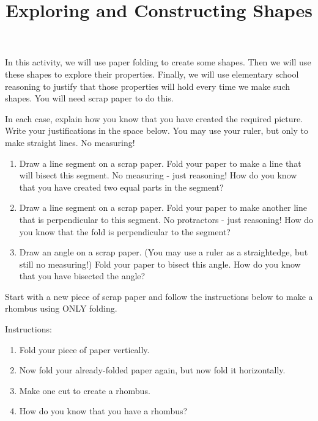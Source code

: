 \documentclass[noauthor, nooutcomes,handout]{ximera}
\title{Exploring and Constructing Shapes}
\begin{document}
\begin{abstract}

\end{abstract}
\maketitle
In this activity, we will use paper folding to create some shapes.  Then we will use these shapes to explore their properties. Finally, we will use elementary school reasoning to justify that those properties will hold every time we make such shapes. You will need scrap paper to do this. 

\begin{problem}

 
In each case, explain how you know that you have created the required picture.  Write your justifications in the space below. You may use your ruler, but only to make straight lines. No measuring!
\begin{enumerate}
    \item Draw a line segment on a scrap paper.  Fold your paper to make a line that will bisect this segment. No measuring - just reasoning! How do you know that you have created two equal parts in the segment?
    \item Draw a line segment on a scrap paper.  Fold your paper to make another line that is perpendicular to this segment. No protractors - just reasoning! How do you know that the fold is perpendicular to the segment?
    \item Draw an angle on a scrap paper. (You may use a ruler as a straightedge, but still no measuring!) Fold your paper to bisect this angle.  How do you know that you have bisected the angle?
\end{enumerate}

\end{problem}

\vfill



\newpage


\begin{problem}
Start with a new piece of scrap paper and follow the instructions below to make a rhombus using ONLY folding.  \

Instructions:
\begin{enumerate}
\item Fold your piece of paper vertically.
\item Now fold your already-folded paper again, but now fold it horizontally.
\item  Make one cut to create a rhombus.
\item How do you know that you have a rhombus?
\end{enumerate}
\end{problem}
\end{document}
